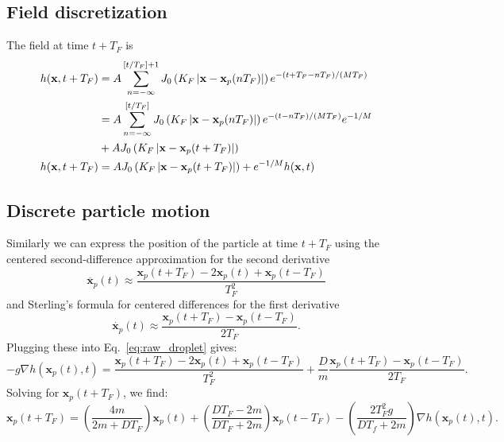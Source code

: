 \documentclass{article}
\newcommand{\x}{\mathbf{x}}
\begin{document}
\subsection{Field discretization}
The field at time $t + T_{F}$ is
\begin{align}
	h(\x,t+T_F) &= A \sum_{n = -\infty}^{\left[ t/T_{F} \right]+1} J_{0} \left( K_{F} \left| \x - \x_{p}(n T_{F}) \right| \right) e^{-(t +T_F- n T_{F})/(M T_{F})} \notag \\
	 &= A \sum_{n = -\infty}^{\left[ t/T_{F} \right]} J_{0} \left( K_{F} \left| \x - \x_{p}(n T_{F}) \right| \right) e^{-(t- n T_{F})/(M T_{F})} e^{-1/M} \notag \\
	 & + A J_{0} \left( K_F \left| \x - \x_p(t + T_F) \right| \right) \notag \\
	h(\x,t+T_F) &= A J_0 \left( K_F \left| \x - \x_p(t + T_F) \right | \right) + e^{-1/M} h(\x,t) \label{eq:discrete_field}
\end{align}

\subsection{Discrete particle motion}
Similarly we can express the position of the particle at time $t + T_{F}$ using the centered second-difference approximation for the second derivative
\begin{equation}
	\ddot{\x_p}(t) \approx \frac{\x_p(t + T_F) - 2 \x_p(t) + \x_p(t - T_F)}{T_F^2}
\end{equation}
and Sterling's formula for centered differences for the first derivative
\begin{equation}
	\dot{\x_p}(t) \approx \frac{\x_p(t + T_F) - \x_p(t - T_F)}{2 T_F}.
\end{equation}
Plugging these into Eq.~\ref{eq:raw_droplet} gives:
\begin{equation}
	\label{eq:dd_crappy}
	-g \nabla h(\x_p(t),t) = \frac{\x_p(t + T_F) - 2 \x_p(t) + \x_p(t - T_F)}{T_F^2}
	 + \frac{D}{m} \frac{\x_p(t + T_F) - \x_p(t - T_F)}{2 T_F}.
\end{equation}
Solving for $\x_p(t + T_F)$, we find:
\begin{equation}
	\label{eq:dd_crappy_2}
	\x_p(t + T_F) = \left( \frac{4 m}{2 m + D T_F} \right) \x_p(t) + \left( \frac{D T_F - 2m}{D T_F + 2m} \right) \x_p(t - T_F) - \left( \frac{2 T_F^2 g}{D T_f + 2m} \right) \nabla h(\x_p(t),t).
\end{equation}
\end{document}
